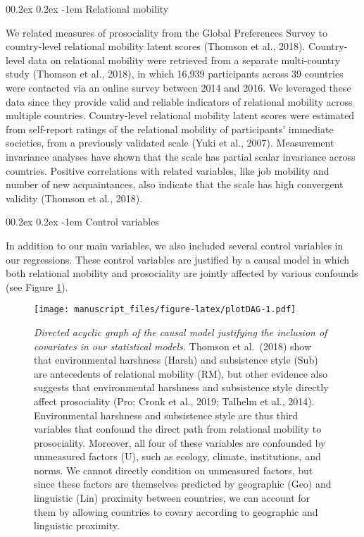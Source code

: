\documentclass[
  man,floatsintext]{apa6}
\makeatletter
\let\oldparagraph\paragraph
\renewcommand{\paragraph}[1]{\oldparagraph{#1}\mbox{}}
\renewcommand{\paragraph}{\@startsection{paragraph}{4}{\parindent}%
  {0\baselineskip \@plus 0.2ex \@minus 0.2ex}%
  {-1em}%
  {\normalfont\normalsize\bfseries\itshape\typesectitle}}
\makeatother
\begin{document}
\hypertarget{relational-mobility}{%
\paragraph{Relational mobility}\label{relational-mobility}}

We related measures of prosociality from the Global Preferences Survey to country-level relational mobility latent scores (Thomson et al., 2018). Country-level data on relational mobility were retrieved from a separate multi-country study (Thomson et al., 2018), in which 16,939 participants across 39 countries were contacted via an online survey between 2014 and 2016. We leveraged these data since they provide valid and reliable indicators of relational mobility across multiple countries. Country-level relational mobility latent scores were estimated from self-report ratings of the relational mobility of participants' immediate societies, from a previously validated scale (Yuki et al., 2007). Measurement invariance analyses have shown that the scale has partial scalar invariance across countries. Positive correlations with related variables, like job mobility and number of new acquaintances, also indicate that the scale has high convergent validity (Thomson et al., 2018).

\hypertarget{control-variables}{%
\paragraph{Control variables}\label{control-variables}}

In addition to our main variables, we also included several control variables in our regressions. These control variables are justified by a causal model in which both relational mobility and prosociality are jointly affected by various confounds (see Figure \ref{fig:plotDAG}).



\begin{figure}
\centering
\texttt{[image: manuscript\_files/figure-latex/plotDAG-1.pdf]}
\caption{\label{fig:plotDAG}\emph{Directed acyclic graph of the causal model justifying the inclusion of covariates in our statistical models.} Thomson et al.~(2018) show that environmental harshness (Harsh) and subsistence style (Sub) are antecedents of relational mobility (RM), but other evidence also suggests that environmental harshness and subsistence style directly affect prosociality (Pro; Cronk et al., 2019; Talhelm et al., 2014). Environmental harshness and subsistence style are thus third variables that confound the direct path from relational mobility to prosociality. Moreover, all four of these variables are confounded by unmeasured factors (U), such as ecology, climate, institutions, and norms. We cannot directly condition on unmeasured factors, but since these factors are themselves predicted by geographic (Geo) and linguistic (Lin) proximity between countries, we can account for them by allowing countries to covary according to geographic and linguistic proximity.}
\end{figure}
\end{document}
